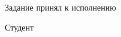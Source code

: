 \intervalS%


Задание принял к исполнению %

\intervalS%

Студент \uline{\hspace*{0.4\textheight}} \Author



